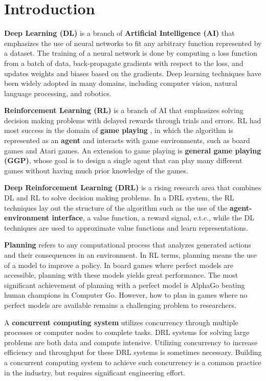 \chapter{Introduction} \label{sec:intro}

\textbf{Deep Learning (DL)} is a branch of \textbf{Artificial Intelligence (AI)} that emphasizes the use of neural networks to fit any arbitrary function represented by a dataset.
The training of a neural network is done by computing a loss function from a batch of data, back-propagate gradients with respect to the loss, and updates weights and biases based on the gradients.
Deep learning techniques have been widely adopted in many domains, including computer vision, natural language processing, and robotics.

\textbf{Reinforcement Learning (RL)} is a branch of AI that emphasizes solving decision making problems with delayed rewards through trials and errors.
RL had most success in the domain of \textbf{game playing} \cite{MasteringGameGo_Silver.Schrittwieser.ea_2017}, in which the algorithm is represented as an \textbf{agent} and interacts with game environments, such as board games and Atari games.
An extension to game playing is \textbf{general game playing (GGP)}, whose goal is to design a single agent that can play many different games without having much prior knowledge of the games.

\textbf{Deep Reinforcement Learning (DRL)} is a rising research area that combines DL and RL to solve decision making problems.
In a DRL system, the RL techniques lay out the structure of the algorithm such as the use of the \textbf{agent-environment interface}, a value function, a reward signal, e.t.c., while the DL techniques are used to approximate value functions and learn representations.

\textbf{Planning} refers to any computational process that analyzes generated actions and their consequences in an environment.
In RL terms, planning means the use of a model to improve a policy.
In board games where perfect models are accessible, planning with these models yields great performance.
The most significant achievement of planning with a perfect model is AlphaGo beating human champions in Computer Go.
However, how to plan in games where no perfect models are available remains a challenging problem to researchers.

A \textbf{concurrent computing system} utilizes concurrency through multiple processes or computer nodes to complete tasks.
DRL systems for solving large problems are both data and compute intensive.
Utilizing concurrency to increase efficiency and throughput for these DRL systems is sometimes necessary.
Building a concurrent computing system to achieve such concurrency is a common practice in the industry, but requires significant engineering effort.

